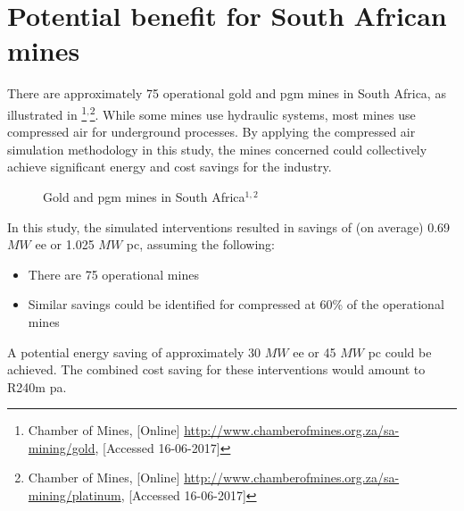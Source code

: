 \section{Potential benefit for South African mines}
There are approximately 75 operational gold and \gls{pgm} mines in South Africa, as illustrated in \footnote{Chamber of Mines, [Online] \url{http://www.chamberofmines.org.za/sa-mining/gold}, [Accessed 16-06-2017]}$^,$\footnote{Chamber of Mines, [Online] \url{http://www.chamberofmines.org.za/sa-mining/platinum}, [Accessed 16-06-2017]}. While some mines use hydraulic systems, most mines use compressed air for underground processes. By applying the compressed air simulation methodology in this study, the mines concerned could collectively achieve significant energy and cost savings for the industry. 
\par 
	\begin{figure}[h!]
		\centering
		\caption[Gold and Platinum group metal mines in South Africa]{Gold and \gls{pgm} mines in South Africa$^{1,2}$}
		\label{fig: Mine map}
	\end{figure}
In this study, the simulated interventions resulted in savings of (on average) 0.69 $MW$ \gls{ee} or 1.025 $ MW $ \gls{pc}, assuming the following:
\begin{itemize}
	\item There are 75 operational mines
	\item Similar savings could be identified for compressed at 60\% of the operational mines
\end{itemize} 
A potential energy saving of approximately 30 $MW$ \gls{ee} or 45 $ MW $ \gls{pc} could be achieved. The combined cost saving for these interventions would amount to R240m \gls{pa}. 

